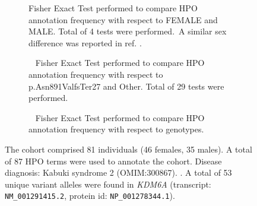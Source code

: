 \begin{figure}[htbp]
\begin{subfigure}[b]{0.95\textwidth}
\centering
{}
\captionsetup{justification=raggedright,singlelinecheck=false}
\caption{Fisher Exact Test performed to compare HPO annotation frequency with respect to FEMALE and MALE. Total of 4 tests were performed. A similar sex difference was reported in ref. \cite{PMID_33674768}.}
\end{subfigure}
\vspace{2em}
\begin{subfigure}[b]{0.95\textwidth}
\centering
{}
\captionsetup{justification=raggedright,singlelinecheck=false}
\caption{         Fisher Exact Test performed to compare HPO annotation frequency with respect to p.Asn891ValfsTer27 and Other. Total of
        29 tests were performed. }
\end{subfigure}
\vspace{2em}
\begin{subfigure}[b]{0.95\textwidth}
\centering
{}
\captionsetup{justification=raggedright,singlelinecheck=false}
\caption{             Fisher Exact Test performed to compare HPO annotation frequency with respect to genotypes. }
\end{subfigure}

\vspace{2em}

\caption{ The cohort comprised 81 individuals (46 females, 35 males). A total of 87 HPO terms were used to annotate the cohort. Disease diagnosis: Kabuki syndrome 2 (OMIM:300867). . A total of 53 unique variant alleles were found in \textit{KDM6A} (transcript: \texttt{NM\_001291415.2}, protein id: \texttt{NP\_001278344.1}).}
\end{figure}
